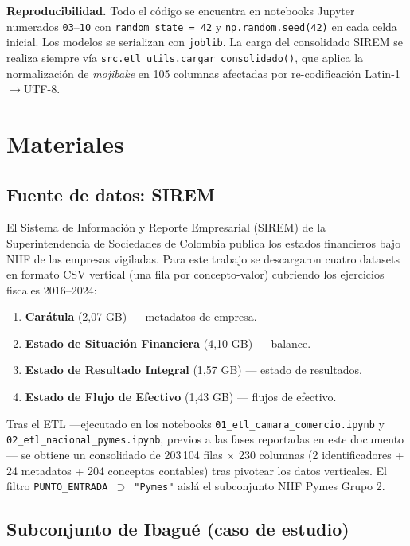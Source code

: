 \documentclass[12pt, letterpaper]{article}
\begin{document}
\textbf{Reproducibilidad.} Todo el c\'odigo se encuentra en notebooks Jupyter numerados \texttt{03}--\texttt{10} con \texttt{random\_state = 42} y \texttt{np.random.seed(42)} en cada celda inicial. Los modelos se serializan con \texttt{joblib}. La carga del consolidado SIREM se realiza siempre v\'ia \texttt{src.etl\_utils.cargar\_consolidado()}, que aplica la normalizaci\'on de \textit{mojibake} en 105 columnas afectadas por re-codificaci\'on Latin-1$\to$UTF-8.

\section{Materiales}
\label{sec:materiales}

\subsection{Fuente de datos: SIREM}

El Sistema de Informaci\'on y Reporte Empresarial (SIREM) de la Superintendencia de Sociedades de Colombia publica los estados financieros bajo NIIF de las empresas vigiladas. Para este trabajo se descargaron cuatro datasets en formato CSV vertical (una fila por concepto-valor) cubriendo los ejercicios fiscales 2016--2024:

\begin{enumerate}
\item \textbf{Car\'atula} (2,07 GB) --- metadatos de empresa.
\item \textbf{Estado de Situaci\'on Financiera} (4,10 GB) --- balance.
\item \textbf{Estado de Resultado Integral} (1,57 GB) --- estado de resultados.
\item \textbf{Estado de Flujo de Efectivo} (1,43 GB) --- flujos de efectivo.
\end{enumerate}

Tras el ETL ---ejecutado en los notebooks \texttt{01\_etl\_camara\_comercio.ipynb} y \texttt{02\_etl\_nacional\_pymes.ipynb}, previos a las fases reportadas en este documento--- se obtiene un consolidado de 203\,104 filas $\times$ 230 columnas (2 identificadores + 24 metadatos + 204 conceptos contables) tras pivotear los datos verticales. El filtro \texttt{PUNTO\_ENTRADA $\supset$ "Pymes"} aisl\'a el subconjunto NIIF Pymes Grupo 2.

\subsection{Subconjunto de Ibagu\'e (caso de estudio)}
\end{document}
